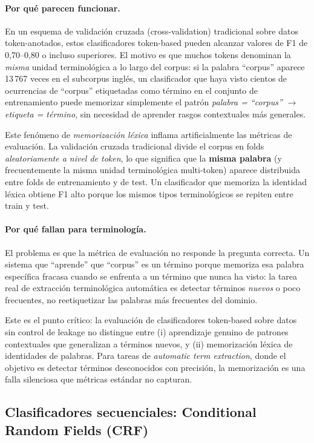 \paragraph{Por qué parecen funcionar.}
En un esquema de validación cruzada (cross-validation) tradicional sobre datos token-anotados, estos clasificadores token-based pueden alcanzar valores de F1 de 0{,}70--0{,}80 o incluso superiores. El motivo es que muchos tokens denominan la \emph{misma} unidad terminológica a lo largo del corpus: si la palabra ``corpus'' aparece 13\,767 veces en el subcorpus inglés, un clasificador que haya visto cientos de ocurrencias de ``corpus'' etiquetadas como término en el conjunto de entrenamiento puede memorizar simplemente el patrón \textit{palabra = ``corpus''} $\rightarrow$ \textit{etiqueta = término}, sin necesidad de aprender rasgos contextuales más generales.

Este fenómeno de \emph{memorización léxica} inflama artificialmente las métricas de evaluación. La validación cruzada tradicional divide el corpus en folds \emph{aleatoriamente a nivel de token}, lo que significa que la \textbf{misma palabra} (y frecuentemente la misma unidad terminológica multi-token) aparece distribuida entre folds de entrenamiento y de test. Un clasificador que memoriza la identidad léxica obtiene F1 alto porque los mismos tipos terminológicos se repiten entre train y test.

\paragraph{Por qué fallan para terminología.}
El problema es que la métrica de evaluación no responde la pregunta correcta. Un sistema que ``aprende'' que ``corpus'' es un término porque memoriza esa palabra específica fracasa cuando se enfrenta a un término que nunca ha visto: la tarea real de extracción terminológica automática es detectar términos \emph{nuevos} o poco frecuentes, no reetiquetizar las palabras más frecuentes del dominio.

Este es el punto crítico: la evaluación de clasificadores token-based sobre datos sin control de leakage no distingue entre (i) aprendizaje genuino de patrones contextuales que generalizan a términos nuevos, y (ii) memorización léxica de identidades de palabras. Para tareas de \emph{automatic term extraction}, donde el objetivo es detectar términos desconocidos con precisión, la memorización es una falla silenciosa que métricas estándar no capturan.

\subsection{Clasificadores secuenciales: Conditional Random Fields (CRF)}
\label{subsec:crf}

